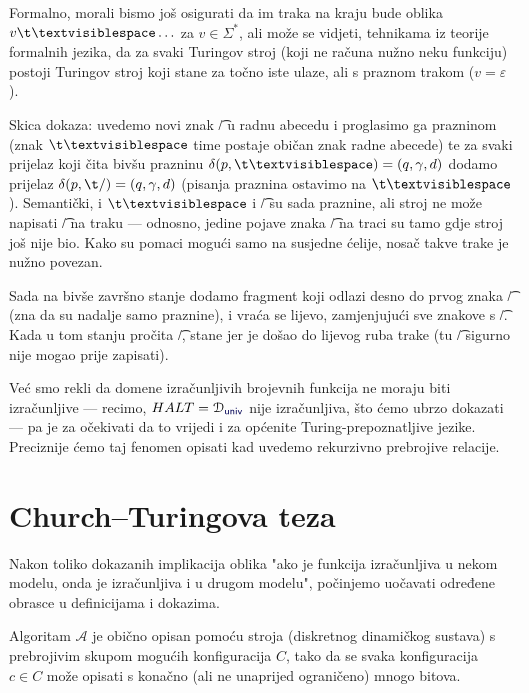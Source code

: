 \begin{napomena}[{name=[za problem zaustavljanja završno stanje trake nije bitno]}]\label{nap:re0}
Formalno, morali bismo još osigurati da im traka na kraju bude oblika $v\bl\ldots$ za $v\in\Sigma^*$, ali može se vidjeti, tehnikama iz teorije formalnih jezika, da za svaki Turingov stroj (koji ne računa nužno neku funkciju) postoji Turingov stroj koji stane za točno iste ulaze, ali s praznom trakom ($v=\varepsilon$).

Skica dokaza: uvedemo novi znak \t/ u radnu abecedu i proglasimo ga prazninom (znak $\bl$ time postaje običan znak radne abecede) te za svaki prijelaz koji čita bivšu prazninu $\delta(p,\bl)=(q,\gamma,d)$ dodamo prijelaz $\delta(p,\t/)=(q,\gamma,d)$ (pisanja praznina ostavimo na $\bl$). Semantički, i $\bl$ i \t/ su sada praznine, ali stroj ne može napisati \t/ na traku --- odnosno, jedine pojave znaka \t/ na traci su tamo gdje stroj još nije bio. Kako su pomaci mogući samo na susjedne ćelije, nosač takve trake je nužno povezan.

Sada na bivše završno stanje dodamo fragment koji odlazi desno do prvog znaka \t/ (zna da su nadalje samo praznine), i vraća se lijevo, zamjenjujući sve znakove s \t/. Kada u tom stanju pročita \t/, stane jer je došao do lijevog ruba trake (tu \t/ sigurno nije mogao prije zapisati).
\end{napomena}

Već smo rekli da domene izračunljivih brojevnih funkcija ne moraju biti izračunljive --- recimo, $HALT=\dom{\f{univ}}$ nije izračunljiva, što ćemo ubrzo dokazati --- pa je za očekivati da to vrijedi i za općenite Turing-prepoznatljive jezike. Preciznije ćemo taj fenomen opisati kad uvedemo rekurzivno prebrojive relacije.

\section{\texorpdfstring{Church--\!Turingova teza}{Church-Turingova teza}}
Nakon toliko dokazanih implikacija oblika "ako je funkcija izračunljiva u nekom modelu, onda je izračunljiva i u drugom modelu", počinjemo uočavati određene obrasce u definicijama i dokazima.


Algoritam $\mathcal A$ je obično opisan pomoću stroja (diskretnog dinamičkog sustava) s prebrojivim skupom mogućih konfiguracija $C$, tako da se svaka konfiguracija $c\in C$ može opisati s konačno (ali ne unaprijed ograničeno) mnogo bitova.

